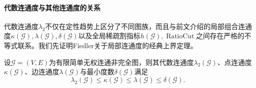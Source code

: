 \paragraph{代数连通度与其他连通度的关系}

代数连通度$\lambda_2$不仅在定性趋势上区分了不同图族，而且与前文介绍的局部组合连通度$\kappa(\mathcal G),\lambda(\mathcal G),\delta(\mathcal G)$以及全局稀疏割指标$h(\mathcal G),\operatorname{RatioCut}$之间存在严格的不等式联系。我们先证明Fiedler关于局部连通度的经典上界定理。

\begin{theorem}
\label{thm:graph-connectivity-comparison}
设$\mathcal G=(V,E)$为有限简单无权连通非完全图，则其代数连通度$\lambda_2(\mathcal G)$、点连通度$\kappa(\mathcal G)$、边连通度$\lambda(\mathcal G)$与最小度数$\delta(\mathcal G)$满足
\begin{equation}
\label{eq:graph-connectivity-comparison}
  \lambda_2(\mathcal G)\leq\kappa(\mathcal G)\leq\lambda(\mathcal G)\leq\delta(\mathcal G).
\end{equation}
\end{theorem}

